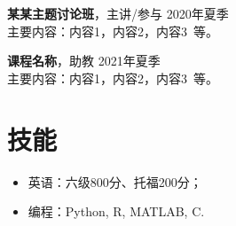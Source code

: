     \vspace{1em}
    {\large{\textbf{某某主题讨论班}}}，主讲/参与 \hfill {2020年夏季}\\
    主要内容：内容1，内容2，内容3\ 等。
    
    \vspace{1em}
    {\large{\textbf{课程名称}}}，助教 \hfill {2021年夏季}\\
    主要内容：内容1，内容2，内容3\ 等。

    \section{\makebox[\widthof{\faWrench}][c]{\color{CQU_Blue}{\faWrench}}\quad 技能}
    \vspace{0.5em}
    \begin{itemize}
        \item 英语：六级800分、托福200分；
        \item 编程：Python, R, MATLAB, C.
    \end{itemize}
    

    
    
